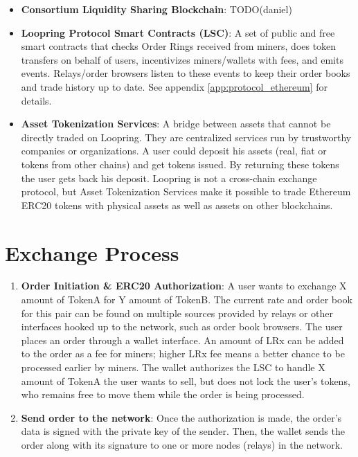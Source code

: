 \documentclass[UTF8,nofonts]{article}
\begin{document}
\begin{multicols}{2}
\begin{itemize}
\item \textbf{Consortium Liquidity Sharing Blockchain}: TODO(daniel)

\item \textbf{Loopring Protocol Smart Contracts (LSC)}: A set of public and free smart contracts that checks Order Rings received from miners, does token transfers on behalf of users, incentivizes miners/wallets with fees, and emits events. Relays/order browsers listen to these events to keep their order books and trade history up to date. See appendix \ref{app:protocol_ethereum} for details.

\item \textbf{Asset Tokenization Services}: A bridge between assets that cannot be directly traded on Loopring. They are centralized services run by trustworthy companies or organizations. A user could deposit his assets (real, fiat or tokens from other chains) and get tokens issued. By returning these tokens the user gets back his deposit. Loopring is not a cross-chain exchange protocol, but Asset Tokenization Services make it possible to trade Ethereum ERC20 \cite{ERC20} tokens with physical assets as well as assets on other blockchains. 

\end{itemize}


\section{Exchange Process\label{sec:process}}
\begin{enumerate} 

\item \textbf{Order Initiation \& ERC20 Authorization}: A user wants to exchange X amount of TokenA for Y amount of TokenB. The current rate and order book for this pair can be found on multiple sources provided by relays or other interfaces hooked up to the network, such as order book browsers. The user places an order through a wallet interface. An amount of LRx can be added to the order as a fee for miners; higher LRx fee means a better chance to be processed earlier by miners. The wallet authorizes the LSC to handle X amount of TokenA the user wants to sell, but does not lock the user's tokens, who remains free to move them while the order is being processed.

\item \textbf{Send order to the network}: Once the authorization is made, the order's data is signed with the private key of the sender. Then, the wallet sends the order along with its signature to one or more nodes (relays) in the network.


\end{enumerate}
\end{multicols}
\end{document}
